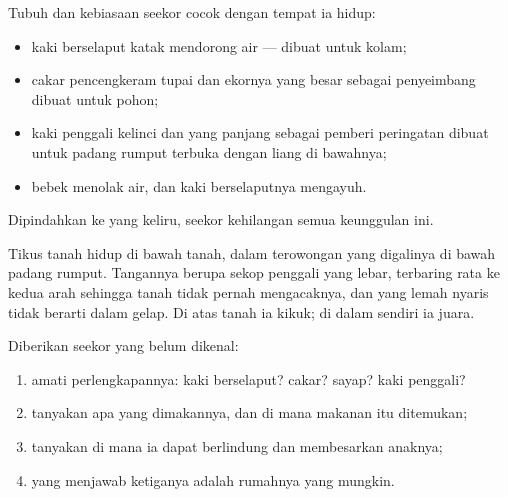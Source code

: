 \begin{proposition}\label{prop:g2:where-animals-live:fit}
Tubuh dan kebiasaan seekor  cocok dengan tempat ia hidup:
\begin{itemize}
  \item kaki berselaput katak mendorong air --- dibuat untuk kolam;
  \item cakar pencengkeram tupai dan ekornya yang besar sebagai
        penyeimbang dibuat untuk pohon;
  \item kaki penggali kelinci dan  yang panjang sebagai
        pemberi peringatan dibuat untuk padang rumput terbuka dengan
        liang di bawahnya;
  \item {} bebek menolak air, dan kaki berselaputnya mengayuh.
\end{itemize}
Dipindahkan ke  yang keliru, seekor  kehilangan semua
keunggulan ini.
\end{proposition}
\admitted

\begin{example}\label{ex:g2:where-animals-live:mole}
Tikus tanah hidup di bawah tanah, dalam terowongan yang digalinya di
bawah padang rumput. Tangannya berupa sekop penggali yang lebar,
 terbaring rata ke kedua arah sehingga tanah tidak pernah
mengacaknya, dan  yang lemah nyaris tidak berarti dalam gelap.
Di atas tanah ia kikuk; di dalam  sendiri ia juara.
\end{example}

\begin{method}\label{met:g2:where-animals-live:matching}
Diberikan seekor  yang belum dikenal:
\begin{enumerate}
  \item amati perlengkapannya: kaki berselaput? cakar? sayap? kaki
        penggali?
  \item tanyakan apa yang dimakannya, dan di mana makanan itu
        ditemukan;
  \item tanyakan di mana ia dapat berlindung dan membesarkan anaknya;
  \item {} yang menjawab ketiganya adalah rumahnya yang mungkin.
\end{enumerate}
\end{method}

